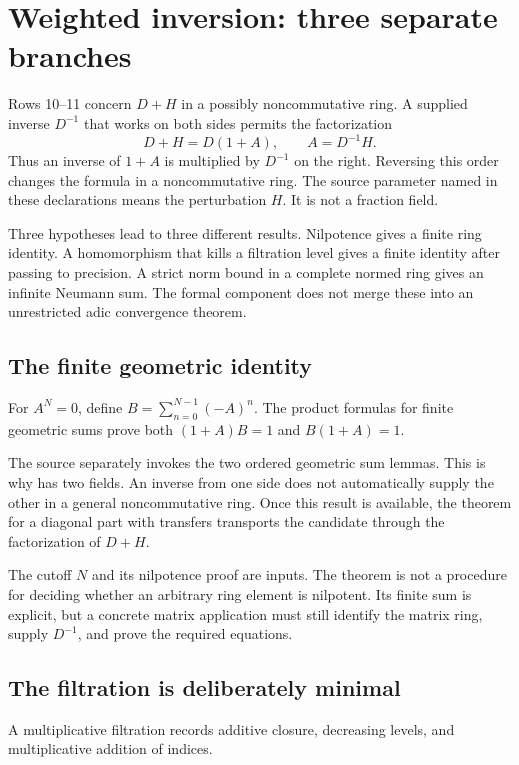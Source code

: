 \section{Weighted inversion: three separate branches}\label{sec:weighted}

Rows 10--11 concern $D+H$ in a possibly noncommutative ring. A supplied inverse $D^{-1}$ that works on both sides permits the factorization
\[
D+H=D(1+A),\qquad A=D^{-1}H.
\]
Thus an inverse of $1+A$ is multiplied by $D^{-1}$ on the right. Reversing this order changes the formula in a noncommutative ring. The source parameter named  in these declarations means the perturbation $H$. It is not a fraction field.

Three hypotheses lead to three different results. Nilpotence gives a finite ring identity. A homomorphism that kills a filtration level gives a finite identity after passing to precision. A strict norm bound in a complete normed ring gives an infinite Neumann sum. The formal component does not merge these into an unrestricted adic convergence theorem.

\subsection{The finite geometric identity}

For $A^N=0$, define $B=\sum_{n=0}^{N-1}(-A)^n$. The product formulas for finite geometric sums prove both $(1+A)B=1$ and $B(1+A)=1$.

The source separately invokes the two ordered geometric sum lemmas. This is why  has two fields. An inverse from one side does not automatically supply the other in a general noncommutative ring. Once this result is available, the theorem for a diagonal part with transfers transports the candidate through the factorization of $D+H$.

The cutoff $N$ and its nilpotence proof are inputs. The theorem is not a procedure for deciding whether an arbitrary ring element is nilpotent. Its finite sum is explicit, but a concrete matrix application must still identify the matrix ring, supply $D^{-1}$, and prove the required equations.

\subsection{The filtration is deliberately minimal}

A multiplicative filtration records additive closure, decreasing levels, and multiplicative addition of indices.

